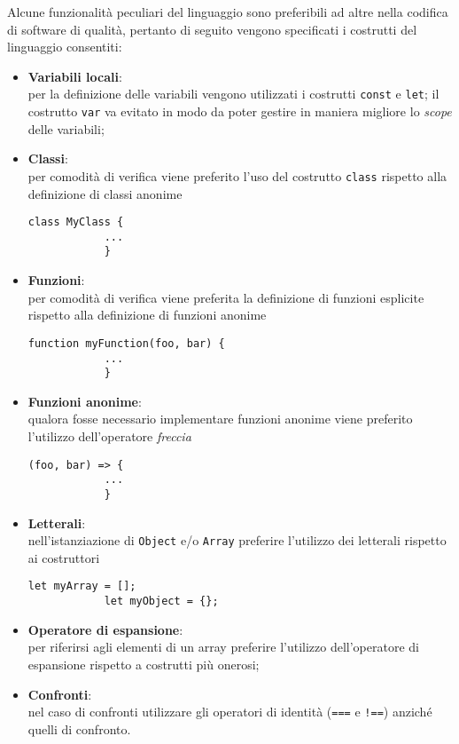 Alcune funzionalità peculiari del linguaggio sono preferibili ad altre nella codifica di software di qualità, pertanto di seguito vengono
specificati i costrutti del linguaggio consentiti:
\begin{itemize}
	\item \textbf{Variabili locali}:\\
		per la definizione delle variabili vengono utilizzati i costrutti \texttt{const} e \texttt{let}; il costrutto \texttt{var} va
		evitato in modo da poter gestire in maniera migliore lo \emph{scope} delle variabili;

	\item \textbf{Classi}:\\
		per comodità di verifica viene preferito l'uso del costrutto \texttt{class} rispetto alla definizione di classi anonime \\
		\begin{lstlisting}[style=htmlcssjs]
			class MyClass {
			...
			}
		\end{lstlisting}

	\item \textbf{Funzioni}:\\
		per comodità di verifica viene preferita la definizione di funzioni esplicite rispetto alla definizione di funzioni anonime \\
		\begin{lstlisting}[style=htmlcssjs]
			function myFunction(foo, bar) {
			...
			}
		\end{lstlisting}

	\item \textbf{Funzioni anonime}:\\
		qualora fosse necessario implementare funzioni anonime viene preferito l'utilizzo dell'operatore \emph{freccia}
		\begin{lstlisting}[style=htmlcssjs]
			(foo, bar) => {
			...
			}
		\end{lstlisting}


	\item \textbf{Letterali}:\\
		nell'istanziazione di \texttt{Object} e/o \texttt{Array} preferire l'utilizzo dei letterali rispetto ai costruttori
		\begin{lstlisting}[style=htmlcssjs]
			let myArray = [];
			let myObject = {};
		\end{lstlisting}

	\item \textbf{Operatore di espansione}:\\
		per riferirsi agli elementi di un array preferire l'utilizzo dell'operatore di espansione rispetto a costrutti più onerosi;

	\item \textbf{Confronti}:\\
		nel caso di confronti utilizzare gli operatori di identità (\texttt{===} e \texttt{!==}) anziché quelli di confronto.
\end{itemize}

